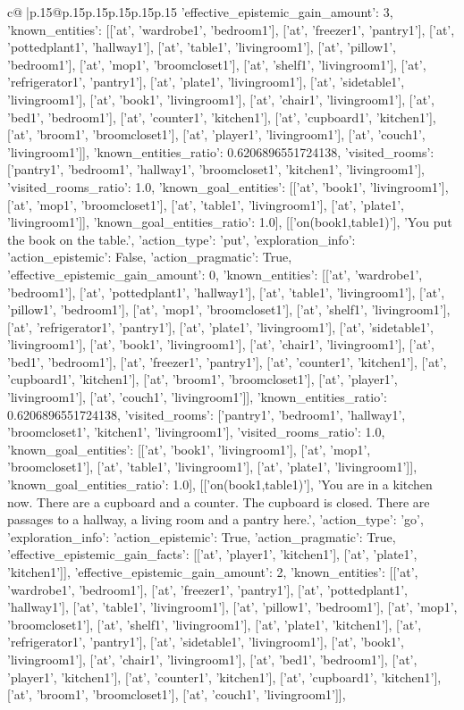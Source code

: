 \documentclass{article}
\begin{document}
{\begin{supertabular}{c@{$\;$}|p{.15\linewidth}@{}p{.15\linewidth}p{.15\linewidth}p{.15\linewidth}p{.15\linewidth}p{.15\linewidth}}
{{{'effective_epistemic_gain_amount': 3, 'known_entities': [['at', 'wardrobe1', 'bedroom1'], ['at', 'freezer1', 'pantry1'], ['at', 'pottedplant1', 'hallway1'], ['at', 'table1', 'livingroom1'], ['at', 'pillow1', 'bedroom1'], ['at', 'mop1', 'broomcloset1'], ['at', 'shelf1', 'livingroom1'], ['at', 'refrigerator1', 'pantry1'], ['at', 'plate1', 'livingroom1'], ['at', 'sidetable1', 'livingroom1'], ['at', 'book1', 'livingroom1'], ['at', 'chair1', 'livingroom1'], ['at', 'bed1', 'bedroom1'], ['at', 'counter1', 'kitchen1'], ['at', 'cupboard1', 'kitchen1'], ['at', 'broom1', 'broomcloset1'], ['at', 'player1', 'livingroom1'], ['at', 'couch1', 'livingroom1']], 'known_entities_ratio': 0.6206896551724138, 'visited_rooms': ['pantry1', 'bedroom1', 'hallway1', 'broomcloset1', 'kitchen1', 'livingroom1'], 'visited_rooms_ratio': 1.0, 'known_goal_entities': [['at', 'book1', 'livingroom1'], ['at', 'mop1', 'broomcloset1'], ['at', 'table1', 'livingroom1'], ['at', 'plate1', 'livingroom1']], 'known_goal_entities_ratio': 1.0}}], [['on(book1,table1)'], 'You put the book on the table.', {'action_type': 'put', 'exploration_info': {'action_epistemic': False, 'action_pragmatic': True, 'effective_epistemic_gain_amount': 0, 'known_entities': [['at', 'wardrobe1', 'bedroom1'], ['at', 'pottedplant1', 'hallway1'], ['at', 'table1', 'livingroom1'], ['at', 'pillow1', 'bedroom1'], ['at', 'mop1', 'broomcloset1'], ['at', 'shelf1', 'livingroom1'], ['at', 'refrigerator1', 'pantry1'], ['at', 'plate1', 'livingroom1'], ['at', 'sidetable1', 'livingroom1'], ['at', 'book1', 'livingroom1'], ['at', 'chair1', 'livingroom1'], ['at', 'bed1', 'bedroom1'], ['at', 'freezer1', 'pantry1'], ['at', 'counter1', 'kitchen1'], ['at', 'cupboard1', 'kitchen1'], ['at', 'broom1', 'broomcloset1'], ['at', 'player1', 'livingroom1'], ['at', 'couch1', 'livingroom1']], 'known_entities_ratio': 0.6206896551724138, 'visited_rooms': ['pantry1', 'bedroom1', 'hallway1', 'broomcloset1', 'kitchen1', 'livingroom1'], 'visited_rooms_ratio': 1.0, 'known_goal_entities': [['at', 'book1', 'livingroom1'], ['at', 'mop1', 'broomcloset1'], ['at', 'table1', 'livingroom1'], ['at', 'plate1', 'livingroom1']], 'known_goal_entities_ratio': 1.0}}], [['on(book1,table1)'], 'You are in a kitchen now. There are a cupboard and a counter. The cupboard is closed. There are passages to a hallway, a living room and a pantry here.', {'action_type': 'go', 'exploration_info': {'action_epistemic': True, 'action_pragmatic': True, 'effective_epistemic_gain_facts': [['at', 'player1', 'kitchen1'], ['at', 'plate1', 'kitchen1']], 'effective_epistemic_gain_amount': 2, 'known_entities': [['at', 'wardrobe1', 'bedroom1'], ['at', 'freezer1', 'pantry1'], ['at', 'pottedplant1', 'hallway1'], ['at', 'table1', 'livingroom1'], ['at', 'pillow1', 'bedroom1'], ['at', 'mop1', 'broomcloset1'], ['at', 'shelf1', 'livingroom1'], ['at', 'plate1', 'kitchen1'], ['at', 'refrigerator1', 'pantry1'], ['at', 'sidetable1', 'livingroom1'], ['at', 'book1', 'livingroom1'], ['at', 'chair1', 'livingroom1'], ['at', 'bed1', 'bedroom1'], ['at', 'player1', 'kitchen1'], ['at', 'counter1', 'kitchen1'], ['at', 'cupboard1', 'kitchen1'], ['at', 'broom1', 'broomcloset1'], ['at', 'couch1', 'livingroom1']], }}}
\end{supertabular}}
\end{document}
